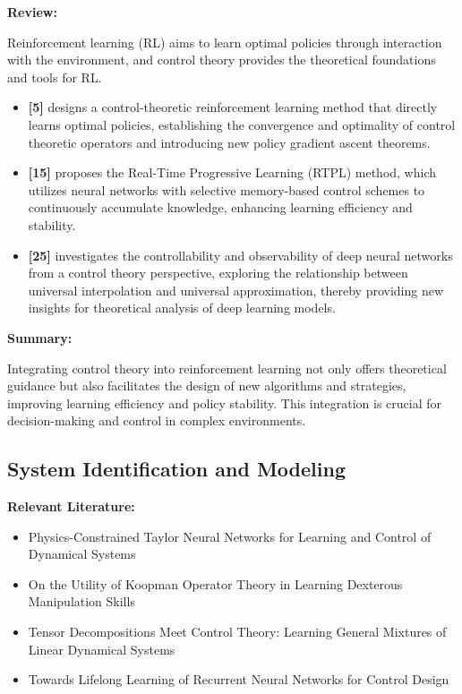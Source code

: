 \documentclass{article}
\theoremstyle{plain}
\theoremstyle{definition}
\theoremstyle{remark}
\begin{document}
\textbf{Review:}

Reinforcement learning (RL) aims to learn optimal policies through interaction with the environment, and control theory provides the theoretical foundations and tools for RL.

\begin{itemize}
    \item \textbf{[5]} designs a control-theoretic reinforcement learning method that directly learns optimal policies, establishing the convergence and optimality of control theoretic operators and introducing new policy gradient ascent theorems.
    
    \item \textbf{[15]} proposes the Real-Time Progressive Learning (RTPL) method, which utilizes neural networks with selective memory-based control schemes to continuously accumulate knowledge, enhancing learning efficiency and stability.
    
    \item \textbf{[25]} investigates the controllability and observability of deep neural networks from a control theory perspective, exploring the relationship between universal interpolation and universal approximation, thereby providing new insights for theoretical analysis of deep learning models.
\end{itemize}

\textbf{Summary:}

Integrating control theory into reinforcement learning not only offers theoretical guidance but also facilitates the design of new algorithms and strategies, improving learning efficiency and policy stability. This integration is crucial for decision-making and control in complex environments.

\subsection{System Identification and Modeling}
\textbf{Relevant Literature:}
\begin{itemize}
    \item Physics-Constrained Taylor Neural Networks for Learning and Control of Dynamical Systems
    \item On the Utility of Koopman Operator Theory in Learning Dexterous Manipulation Skills
    \item Tensor Decompositions Meet Control Theory: Learning General Mixtures of Linear Dynamical Systems
    \item Towards Lifelong Learning of Recurrent Neural Networks for Control Design
\end{itemize}
\end{document}
